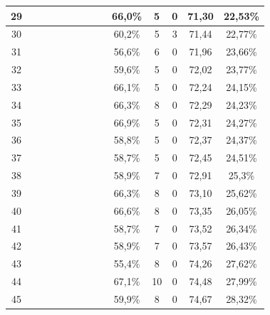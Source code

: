 \begin{longtable}{|c|c|c|c|c|c|c|c|c|c|c|c|c|c|}
29 &  \x    & \x    & \x    &       & \x\m  & \x    &       & \x    & 66,0\% &  5  & 0  & 71,30 & 22,53\% \\ \hline
30 &  \x    & \x    & \x    &       & \x    & \x\m  &       &       & 60,2\% &  5  & 3  & 71,44 & 22,77\% \\ \hline
31 &  \x    & \x    & \x    &       &       &       &       &       & 56,6\% &  6  & 0  & 71,96 & 23,66\% \\ \hline
32 &  \x    & \x    & \x    & \x    & \x    &       &       & \x    & 59,6\% &  5  & 0  & 72,02 & 23,77\% \\ \hline
33 &  \x    & \x    & \x    & \x    & \x\m  &       & \x    &       & 66,1\% &  5  & 0  & 72,24 & 24,15\% \\ \hline
34 &  \x    & \x    & \x    &       & \x\m  & \x    & \x\m  &       & 66,3\% &  8  & 0  & 72,29 & 24,23\% \\ \hline
35 &  \x    & \x    & \x    &       & \x\m  & \x\m  &       &       & 66,9\% &  5  & 0  & 72,31 & 24,27\% \\ \hline
36 &  \x    & \x    & \x    & \x    & \x    & \x    &       & \x\m  & 58,8\% &  5  & 0  & 72,37 & 24,37\% \\ \hline
37 &  \x    & \x    & \x    &       & \x    & \x    &       & \x    & 58,7\% &  5  & 0  & 72,45 & 24,51\% \\ \hline
38 &  \x    & \x    & \x    & \x    & \x    & \x\m  &       & \x\m  & 58,9\% &  7  & 0  & 72,91 & 25,3\% \\ \hline
39 &  \x    & \x    &       &       & \x\m  & \x\m  & \x\m  &       & 66,3\% &  8  & 0  & 73,10 & 25,62\% \\ \hline
40 &  \x    & \x    & \x    & \x    & \x\m  &       &       &       & 66,6\% &  8  & 0  & 73,35 & 26,05\% \\ \hline
41 &  \x    & \x    & \x    &       & \x    &       &       & \x    & 58,7\% &  7  & 0  & 73,52 & 26,34\% \\ \hline
42 &  \x    & \x    & \x    &       & \x    & \x\m  &       & \x\m  & 58,9\% &  7  & 0  & 73,57 & 26,43\% \\ \hline
43 &  \x    & \x    & \x    &       &       & \x    &       & \x\m  & 55,4\% &  8  & 0  & 74,26 & 27,62\% \\ \hline
44 &  \x    & \x    &       &       & \x\m  & \x\m  &       &       & 67,1\% &  10 & 0  & 74,48 & 27,99\% \\ \hline
45 &  \x    & \x    & \x    &       & \x    &       &       & \x\m  & 59,9\% &  8  & 0  & 74,67 & 28,32\% \\ \hline

\end{longtable}
